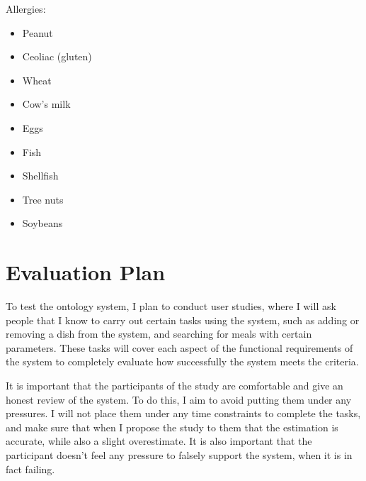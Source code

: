 Allergies\cite{burks2001food}:

\begin{itemize}
\item Peanut
\item Ceoliac (gluten)
\item Wheat
\item Cow's milk
\item Eggs
\item Fish
\item Shellfish
\item Tree nuts
\item Soybeans
\end{itemize}

\section{Evaluation Plan}

To test the ontology system, I plan to conduct user studies, where I will ask people that I know to carry out certain tasks using the system, such as adding or removing a dish from the system, and searching for meals with certain parameters. These tasks will cover each aspect of the functional requirements of the system to completely evaluate how successfully the system meets the criteria.

It is important that the participants of the study are comfortable and give an honest review of the system. To do this, I aim to avoid putting them under any pressures. I will not place them under any time constraints to complete the tasks, and make sure that when I propose the study to them that the estimation is accurate, while also a slight overestimate. It is also important that the participant doesn't feel any pressure to falsely support the system, when it is in fact failing.


